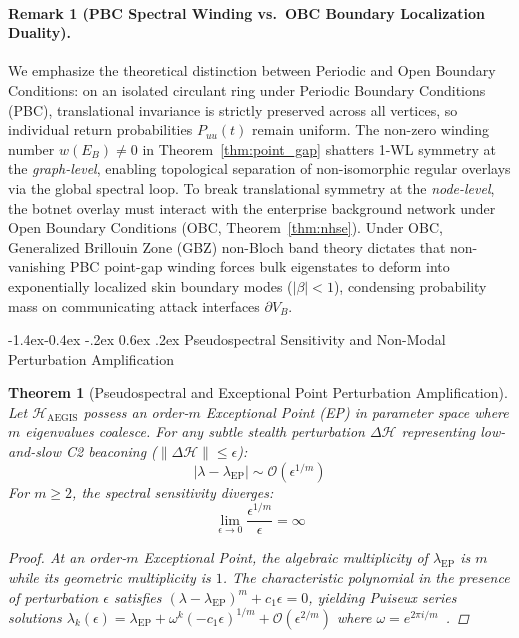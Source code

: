 \documentclass[10pt,twocolumn,letterpaper]{article}
\makeatletter
\renewcommand\subsection{\@startsection{subsection}{2}{\z@}%
                                     {-1.4ex\@plus -0.4ex \@minus -.2ex}%
                                     {0.6ex \@plus .2ex}%
                                     {\normalfont\normalsize\bfseries}}
\newtheorem{theorem}{Theorem}
\makeatother
\begin{document}
\paragraph{Remark 1 (PBC Spectral Winding vs.\ OBC Boundary Localization Duality).}
We emphasize the theoretical distinction between Periodic and Open Boundary Conditions: on an isolated circulant ring under Periodic Boundary Conditions (PBC), translational invariance is strictly preserved across all vertices, so individual return probabilities $P_{uu}(t)$ remain uniform. The non-zero winding number $w(E_B) \ne 0$ in Theorem~\ref{thm:point_gap} shatters 1-WL symmetry at the \textit{graph-level}, enabling topological separation of non-isomorphic regular overlays via the global spectral loop. To break translational symmetry at the \textit{node-level}, the botnet overlay must interact with the enterprise background network under Open Boundary Conditions (OBC, Theorem~\ref{thm:nhse}). Under OBC, Generalized Brillouin Zone (GBZ) non-Bloch band theory dictates that non-vanishing PBC point-gap winding forces bulk eigenstates to deform into exponentially localized skin boundary modes ($|\beta| < 1$), condensing probability mass on communicating attack interfaces $\partial V_B$.

\subsection{Pseudospectral Sensitivity and Non-Modal Perturbation Amplification}

\begin{theorem}[Pseudospectral and Exceptional Point Perturbation Amplification]
\label{thm:ep}
Let $\mathcal{H}_{\text{AEGIS}}$ possess an order-$m$ Exceptional Point (EP) in parameter space where $m$ eigenvalues coalesce. For any subtle stealth perturbation $\Delta \mathcal{H}$ representing low-and-slow C2 beaconing ($\|\Delta \mathcal{H}\| \le \epsilon$):
\begin{equation}
|\lambda - \lambda_{\mathrm{EP}}| \sim \mathcal{O}\left(\epsilon^{1/m}\right)
\end{equation}
For $m \ge 2$, the spectral sensitivity diverges:
\begin{equation}
\lim_{\epsilon \to 0} \frac{\epsilon^{1/m}}{\epsilon} = \infty
\end{equation}
\begin{proof}
At an order-$m$ Exceptional Point, the algebraic multiplicity of $\lambda_{\mathrm{EP}}$ is $m$ while its geometric multiplicity is $1$. The characteristic polynomial in the presence of perturbation $\epsilon$ satisfies $(\lambda - \lambda_{\mathrm{EP}})^m + c_1 \epsilon = 0$, yielding Puiseux series solutions $\lambda_k(\epsilon) = \lambda_{\mathrm{EP}} + \omega^k (-c_1 \epsilon)^{1/m} + \mathcal{O}(\epsilon^{2/m})$ where $\omega = e^{2\pi i / m}$~\cite{bergholtz2021exceptional, trefethen2005spectra}.
\end{proof}
\end{theorem}
\end{document}
